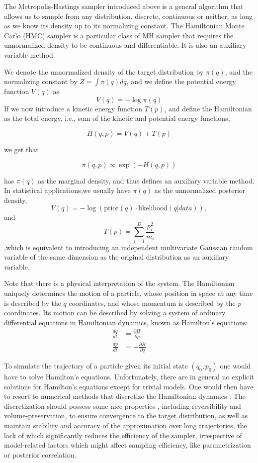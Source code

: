 \documentclass[]{report}
\begin{document}
The Metropolis-Hastings sampler introduced above is a general algorithm that allows us to sample from any distribution, discrete, continuous or neither, as long as we know its density up to its normalizing constant. The Hamiltonian Monte Carlo (HMC) sampler is a particular class of MH sampler that requires the unnormalized density to be continuous and differentiable. It is also an auxiliary variable method. 


We denote the unnormalized density of the target distribution by $\pi(q)$, and the normalizing constant by $Z = \int\pi(q)dq $, and we define the potential energy function $V(q)$ as 
\[ V(q) =  -\log \pi(q) \]
If we now introduce a kinetic energy function $T(p)$, and define
the Hamiltonian as the total energy, i.e., sum of the kinetic and potential energy functions, 

\[ H(q,p) = V(q) + T(p) \]

we get that 

\[\pi(q,p) \propto  \exp(-H(q,p)) \]

has $\pi(q)$ as the marginal density, and thus defines an auxiliary variable method. In statistical applications,we usually have $\pi(q)$ as the unnormalized posterior
density, 
\[V(q) = -\log(\text{prior}(q) \cdot \text{likelihood}(q|data) ), \]
and 
\[T(p) = \sum_{i=1}^D \frac{p_i^2}{m_i} \]
,which is equivalent to introducing an independent multivariate Gaussian random variable of
the same dimension as the original distribution as an auxiliary variable. 

Note that there is a physical interpretation of the system. The Hamiltonian uniquely determines the motion of a particle, whose position in space at any time is described by the $q$ coordinates, and whose momentum is described by the $p$ coordinates. Its motion can be described by solving a system of ordinary differential equations in Hamiltonian dynamics, known as Hamilton's equations:
\begin{align}
    \frac{dq}{dt} &= \frac{\partial H}{\partial p } \\
    \frac{dp}{dt} &= -\frac{\partial H}{\partial q}
\end{align}


To simulate the trajectory of a particle given its initial state $(q_0,p_0)$ one
would have to solve Hamilton's equations. Unfortunately, there are in general no
explicit solutions for Hamilton's equations except for trivial models. One would
then have to resort to numerical methods that discretize the Hamiltonian
dynamics \cite{leimkuhler2004simulating}. The discretization should
possess some nice properties , including reversibility and volume-preservation, to ensure convergence to the target distribution, as well as  maintain 
stability and accuracy of the approximation over long trajectories, the lack of which significantly reduces the efficiency of the sampler, irrespective of model-related factors which might affect sampling efficiency, like parametrization or posterior correlation.  
\end{document}
